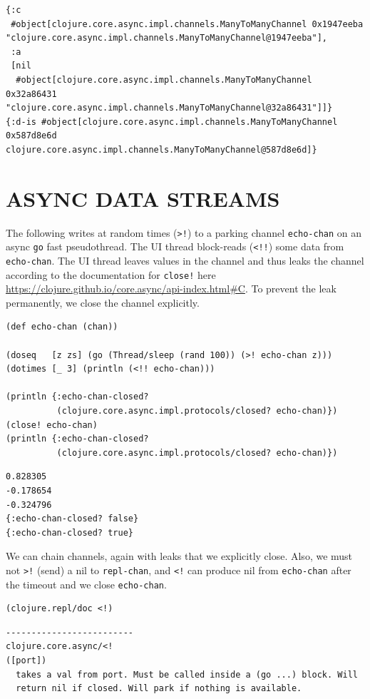 \documentclass[10pt,oneside,x11names]{article}
\begin{document}
\begin{verbatim}
{:c
 #object[clojure.core.async.impl.channels.ManyToManyChannel 0x1947eeba "clojure.core.async.impl.channels.ManyToManyChannel@1947eeba"],
 :a
 [nil
  #object[clojure.core.async.impl.channels.ManyToManyChannel 0x32a86431 "clojure.core.async.impl.channels.ManyToManyChannel@32a86431"]]}
{:d-is #object[clojure.core.async.impl.channels.ManyToManyChannel 0x587d8e6d clojure.core.async.impl.channels.ManyToManyChannel@587d8e6d]}
\end{verbatim}

\section{ASYNC DATA STREAMS}
\label{async-data-streams}
The following writes at random times (\texttt{>!}) to a parking channel
\texttt{echo-chan} on an async \texttt{go} fast pseudothread. The UI thread
block-reads (\texttt{<!!}) some data from \texttt{echo-chan}. The UI thread leaves
values in the channel and thus leaks the channel according to the
documentation for \texttt{close!} here
\url{https://clojure.github.io/core.async/api-index.html\#C}. To prevent the
leak permanently, we close the channel explicitly.

\begin{verbatim}
(def echo-chan (chan))

(doseq   [z zs] (go (Thread/sleep (rand 100)) (>! echo-chan z)))
(dotimes [_ 3] (println (<!! echo-chan)))

(println {:echo-chan-closed?
          (clojure.core.async.impl.protocols/closed? echo-chan)})
(close! echo-chan)
(println {:echo-chan-closed?
          (clojure.core.async.impl.protocols/closed? echo-chan)})
\end{verbatim}

\begin{verbatim}
0.828305
-0.178654
-0.324796
{:echo-chan-closed? false}
{:echo-chan-closed? true}
\end{verbatim}


We can chain channels, again with leaks that we explicitly close. Also, we must
not \texttt{>!} (send) a nil to \texttt{repl-chan}, and \texttt{<!} can produce nil from \texttt{echo-chan}
after the timeout and we close \texttt{echo-chan}.

\begin{verbatim}
(clojure.repl/doc <!)
\end{verbatim}

\begin{verbatim}
-------------------------
clojure.core.async/<!
([port])
  takes a val from port. Must be called inside a (go ...) block. Will
  return nil if closed. Will park if nothing is available.
\end{verbatim}
\end{document}
